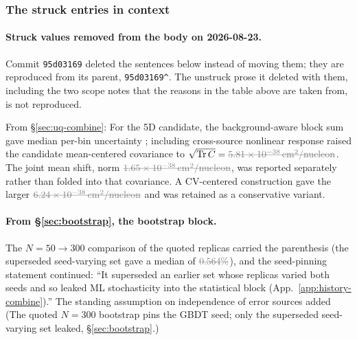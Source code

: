 
\subsubsection{The struck entries in context}
\label{app:history-errata-context}

\paragraph{Struck values removed from the body on 2026-08-23.} Commit \texttt{95d03169} deleted the sentences below instead of moving them; they are reproduced from its parent, \texttt{95d03169\^{}}. The unstruck prose it deleted with them, including the two scope notes that the reasons in the table above are taken from, is not reproduced.

From \S\ref{sec:uq-combine}: For the 5D candidate, the background-aware block sum gave median per-bin uncertainty \dead{\SI{\gbdtFiveBlockMedian}{\percent}}; including cross-source nonlinear response raised the candidate mean-centered covariance to $\sqrt{\mathrm{Tr}\,C}=\dead{\SI{\gbdtFiveAdoptTrace}{cm^2/nucleon}}$. The joint mean shift, norm $\dead{\SI{\gbdtFiveMeanShift}{cm^2/nucleon}}$, was reported separately rather than folded into that covariance. A CV-centered construction gave the larger $\dead{\SI{\gbdtFiveCVTrace}{cm^2/nucleon}}$ and was retained as a conservative variant.

\paragraph{From \S\ref{sec:bootstrap}, the bootstrap block.} The $N=50\to300$ comparison of the quoted replicas carried the parenthesis (the superseded seed-varying set gave a median of $\dead{0.564\%}$), and the seed-pinning statement continued: ``It superseded an earlier set whose replicas varied both seeds and so leaked ML stochasticity into the statistical block (App.~\ref{app:history-combine}).'' The standing assumption on independence of error sources added (The quoted $N=300$ bootstrap pins the GBDT seed; only the superseded seed-varying set leaked, \S\ref{sec:bootstrap}.)

